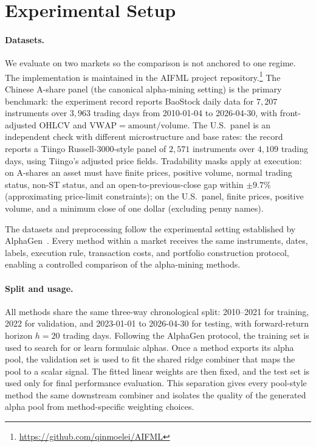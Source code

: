 \section{Experimental Setup}
\label{sec:alphaqd_setup}

\paragraph{Datasets.} We evaluate on two markets so the comparison is not anchored to one regime. The implementation is maintained in the AIFML project repository.\footnote{\url{https://github.com/qinmoelei/AIFML}} The Chinese A-share panel (the canonical alpha-mining setting) is the primary benchmark: the experiment record reports BaoStock daily data for $7{,}207$ instruments over $3{,}963$ trading days from 2010-01-04 to 2026-04-30, with front-adjusted OHLCV and $\mathrm{VWAP}=\mathrm{amount}/\mathrm{volume}$. The U.S.\ panel is an independent check with different microstructure and base rates: the record reports a Tiingo Russell-3000-style panel of $2{,}571$ instruments over $4{,}109$ trading days, using Tiingo's adjusted price fields. Tradability masks apply at execution: on A-shares an asset must have finite prices, positive volume, normal trading status, non-ST status, and an open-to-previous-close gap within $\pm 9.7\%$ (approximating price-limit constraints); on the U.S.\ panel, finite prices, positive volume, and a minimum close of one dollar (excluding penny names).

The datasets and preprocessing follow the experimental setting established by AlphaGen~\cite{yu2023alphagen}. Every method within a market receives the same instruments, dates, labels, execution rule, transaction costs, and portfolio construction protocol, enabling a controlled comparison of the alpha-mining methods.

\paragraph{Split and usage.} All methods share the same three-way chronological split: 2010--2021 for training, 2022 for validation, and 2023-01-01 to 2026-04-30 for testing, with forward-return horizon $h=20$ trading days. Following the AlphaGen protocol, the training set is used to search for or learn formulaic alphas. Once a method exports its alpha pool, the validation set is used to fit the shared ridge combiner that maps the pool to a scalar signal. The fitted linear weights are then fixed, and the test set is used only for final performance evaluation. This separation gives every pool-style method the same downstream combiner and isolates the quality of the generated alpha pool from method-specific weighting choices.

